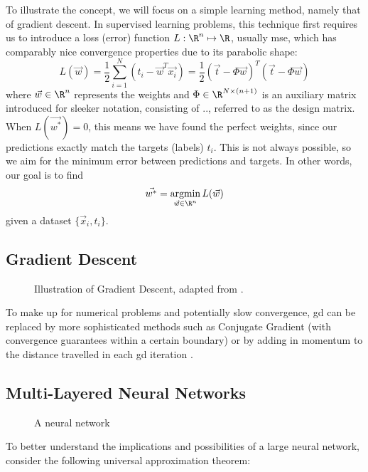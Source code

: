To illustrate the concept, we will focus on a simple learning method, namely that of gradient descent.
In supervised learning problems, this technique first requires us to introduce a loss (error) function $L: \R^n \mapsto \R$, usually \gls{mse}, which has comparably nice convergence properties due to its parabolic shape:
$$L(\vec{w}) = \frac{1}{2} \sum_{i=1}^N (t_i - \vec{w}^T \vec{x_i}) = \frac{1}{2} (\vec{t} - \Phi \vec{w})^T (\vec{t} - \Phi \vec{w})$$
where $\vec{w} \in \R^n$ represents the weights and $\Phi \in \R^{N \times (n+1)}$ is an auxiliary matrix introduced for sleeker notation, consisting of .., referred to as the design matrix.
When $L(\vec{w^*}) = 0$, this means we have found the perfect weights, since our predictions exactly match the targets (labels) $t_i$.
This is not always possible, so we aim for the minimum error between predictions and targets.
In other words, our goal is to find
$$\vec{w^*} = \underset{\vec{w} \in \R^n}{\text{argmin}}\, L(\vec{w})$$
given a dataset $\{\vec{x}_i, t_i\}$.

\subsection{Gradient Descent}
\begin{figure}[H]
  \centering
  \caption{Illustration of Gradient Descent, adapted from \parencite{gradient-descent-plot}.}
\end{figure}


To make up for numerical problems and potentially slow convergence, \gls{gd} can be replaced by more sophisticated methods such as Conjugate Gradient (with convergence guarantees within a certain boundary) or by adding in momentum to the distance travelled in each \gls{gd} iteration \parencite{bishop-pattern-recognition-and-ml}.

\subsection{Multi-Layered Neural Networks}
\begin{figure}[H]
  \centering
  \caption{A neural network }
\end{figure}

To better understand the implications and possibilities of a large neural network, consider the following universal approximation theorem:

